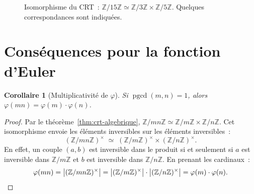 \documentclass[12pt,a4paper,openany]{book}
\theoremstyle{definition}
\theoremstyle{plain}
\newtheorem{corollaire}[definition]{Corollaire}
\theoremstyle{remark}
\newcommand{\Z}{\mathbb{Z}}
\newcommand{\abs}[1]{\left|#1\right|}
\DeclareMathOperator{\pgcd}{pgcd}
\begin{document}
\begin{figure}[ht]
\centering
{}
\caption{Isomorphisme du CRT~: $\Z/15\Z \simeq \Z/3\Z \times \Z/5\Z$.
Quelques correspondances sont indiquées.}
\label{fig:crt-iso}
\end{figure}

\section{Conséquences pour la fonction d'Euler}
\label{sec:crt:euler}

\begin{corollaire}[Multiplicativité de $\varphi$]
\label{cor:phi-multiplicative}
Si $\pgcd(m, n) = 1$, alors $\varphi(mn) = \varphi(m) \cdot \varphi(n)$.
\end{corollaire}

\begin{proof}
Par le théorème~\ref{thm:crt-algebrique}, $\Z/mn\Z \simeq \Z/m\Z \times \Z/n\Z$.
Cet isomorphisme envoie les éléments inversibles sur les éléments inversibles~:
\[
  (\Z/mn\Z)^\times \;\simeq\; (\Z/m\Z)^\times \times (\Z/n\Z)^\times.
\]
En effet, un couple $(a, b)$ est inversible dans le produit si et seulement si
$a$ est inversible dans $\Z/m\Z$ et $b$ est inversible dans $\Z/n\Z$.
En prenant les cardinaux~:
\[
  \varphi(mn) = \abs{(\Z/mn\Z)^\times}
             = \abs{(\Z/m\Z)^\times} \cdot \abs{(\Z/n\Z)^\times}
             = \varphi(m) \cdot \varphi(n). \qedhere
\]
\end{proof}
\end{document}
